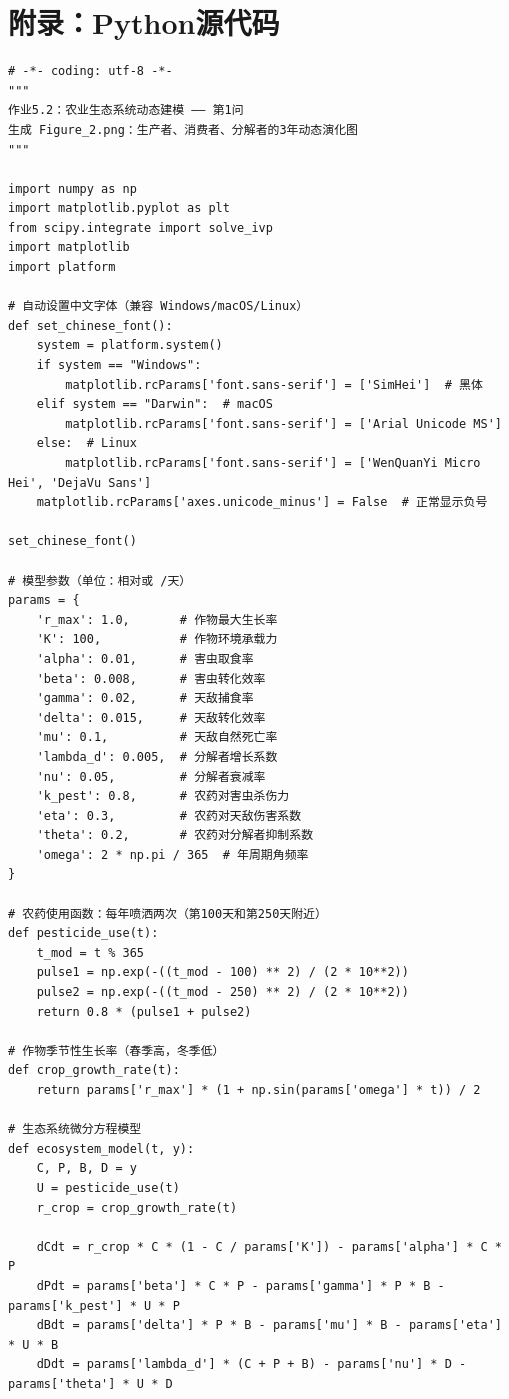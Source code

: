 \documentclass[12pt]{article}
\begin{document}
\section*{附录：Python源代码}
\begin{verbatim}
# -*- coding: utf-8 -*-
"""
作业5.2：农业生态系统动态建模 —— 第1问
生成 Figure_2.png：生产者、消费者、分解者的3年动态演化图
"""

import numpy as np
import matplotlib.pyplot as plt
from scipy.integrate import solve_ivp
import matplotlib
import platform

# 自动设置中文字体（兼容 Windows/macOS/Linux）
def set_chinese_font():
    system = platform.system()
    if system == "Windows":
        matplotlib.rcParams['font.sans-serif'] = ['SimHei']  # 黑体
    elif system == "Darwin":  # macOS
        matplotlib.rcParams['font.sans-serif'] = ['Arial Unicode MS']
    else:  # Linux
        matplotlib.rcParams['font.sans-serif'] = ['WenQuanYi Micro Hei', 'DejaVu Sans']
    matplotlib.rcParams['axes.unicode_minus'] = False  # 正常显示负号

set_chinese_font()

# 模型参数（单位：相对或 /天）
params = {
    'r_max': 1.0,       # 作物最大生长率
    'K': 100,           # 作物环境承载力
    'alpha': 0.01,      # 害虫取食率
    'beta': 0.008,      # 害虫转化效率
    'gamma': 0.02,      # 天敌捕食率
    'delta': 0.015,     # 天敌转化效率
    'mu': 0.1,          # 天敌自然死亡率
    'lambda_d': 0.005,  # 分解者增长系数
    'nu': 0.05,         # 分解者衰减率
    'k_pest': 0.8,      # 农药对害虫杀伤力
    'eta': 0.3,         # 农药对天敌伤害系数
    'theta': 0.2,       # 农药对分解者抑制系数
    'omega': 2 * np.pi / 365  # 年周期角频率
}

# 农药使用函数：每年喷洒两次（第100天和第250天附近）
def pesticide_use(t):
    t_mod = t % 365
    pulse1 = np.exp(-((t_mod - 100) ** 2) / (2 * 10**2))
    pulse2 = np.exp(-((t_mod - 250) ** 2) / (2 * 10**2))
    return 0.8 * (pulse1 + pulse2)

# 作物季节性生长率（春季高，冬季低）
def crop_growth_rate(t):
    return params['r_max'] * (1 + np.sin(params['omega'] * t)) / 2

# 生态系统微分方程模型
def ecosystem_model(t, y):
    C, P, B, D = y
    U = pesticide_use(t)
    r_crop = crop_growth_rate(t)
    
    dCdt = r_crop * C * (1 - C / params['K']) - params['alpha'] * C * P
    dPdt = params['beta'] * C * P - params['gamma'] * P * B - params['k_pest'] * U * P
    dBdt = params['delta'] * P * B - params['mu'] * B - params['eta'] * U * B
    dDdt = params['lambda_d'] * (C + P + B) - params['nu'] * D - params['theta'] * U * D
    

\end{verbatim}
\end{document}
